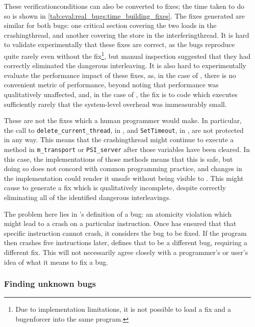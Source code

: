 \noindent
These \glspl{verificationcondition} can also be converted to fixes;
the time taken to do so is shown in
\autoref{tab:eval:real_bugs:time_building_fixes}.  The fixes generated
are similar for both bugs: one critical section covering the two loads
in the \gls{crashingthread}, and another covering the store in the
\gls{interferingthread}.  It is hard to
validate experimentally that these fixes are correct, as the bugs
reproduce quite rarely even without the fix\footnote{Due to
  implementation limitations, it is not possible to load a
  {\technique} fix and a {\technique} \gls{bugenforcer} into the same
  program.}, but manual inspection suggested that they had correctly
eliminated the dangerous interleaving.  It is also hard to
experimentally evaluate the performance impact of these fixes, as, in
the case of , there is no convenient metric of
performance, beyond noting that performance was qualitatively
unaffected, and, in the case of , the fix is to code
which executes sufficiently rarely that the system-level overhead was
immeasurably small.

These are not the fixes which a human programmer would make.  In
particular, the call to \texttt{delete\_current\_thread}, in
, and \texttt{SetTimeout}, in ,
are not protected in any way.  This means that the
\gls{crashingthread} might continue to execute a method in
\texttt{m\_transport} or \texttt{PSI\_server} after those variables
have been cleared.  In this case, the implementations of those methods
means that this is safe, but doing so does not concord with common
programming practice, and changes in the implementation could render
it unsafe without being visible to {\technique}.  This might cause
{\technique} to generate a fix which is qualitatively incomplete,
despite correctly eliminating all of the identified dangerous
interleavings.

The problem here lies in {\technique}'s definition of a bug: an
atomicity violation which might lead to a crash on a particular
instruction.  Once {\technique} has ensured that that specific
instruction cannot crash, it considers the bug to be fixed.  If the
program then crashes five instructions later, {\technique} defines
that to be a different bug, requiring a different fix.  This will not
necessarily agree closely with a programmer's or user's idea of what
it means to fix a bug.

\subsubsection{Finding unknown bugs}

